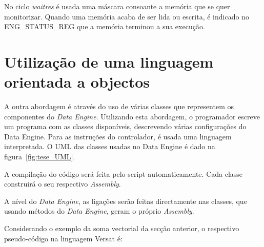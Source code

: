 No ciclo {\it waitres} é usada uma máscara consoante a memória que se quer monitorizar. Quando uma memória acaba de ser lida ou escrita, é indicado no ENG{\_}STATUS{\_}REG que a memória terminou a sua execução.



\section{Utilização de uma linguagem orientada a objectos}
\label{section:Utilizacao de uma linguagem orientada a objectos}


A outra abordagem é através do uso de várias classes que representem os componentes do {\it Data Engine}. Utilizando esta abordagem, o programador escreve um programa com as classes disponíveis, descrevendo várias configurações do Data Engine.
Para as instruções do controlador, é usada uma linguagem interpretada. O UML das classes usadas no Data Engine é dado na figura~\ref{fig:tese_UML}.


A compilação do código será feita pelo script automaticamente. Cada classe construirá o seu respectivo {\it Assembly}.

A nível do {\it Data Engine}, as ligações serão feitas directamente nas classes, que usando métodos do {\it Data Engine}, geram o próprio {\it Assembly}. 








Considerando o exemplo da soma vectorial da secção anterior, o respectivo pseudo-código na linguagem Versat é:

